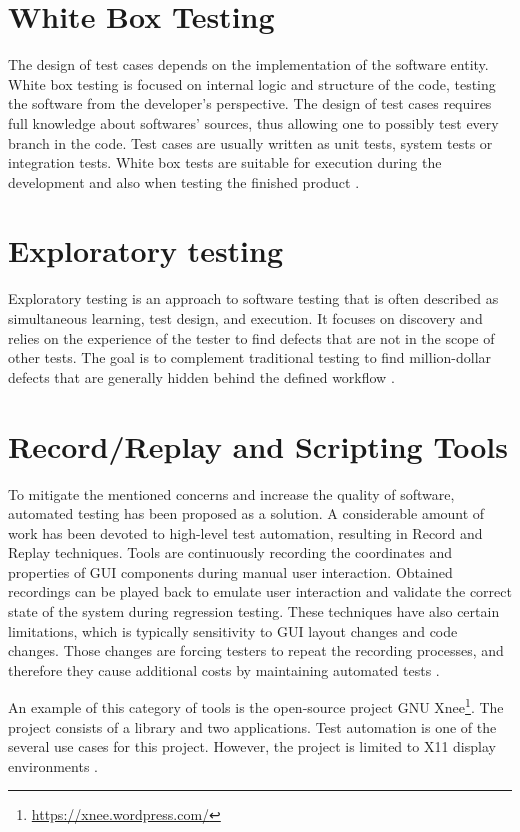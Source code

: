 \section{White Box Testing}
The design of test cases depends on the implementation of the software entity. White box testing is focused on internal logic and structure of the code, testing the software from the developer's perspective. The design of test cases requires full knowledge about softwares' sources, thus allowing one to possibly test every branch in the code. Test cases are usually written as unit tests, system tests or integration tests. White box tests are suitable for execution during the development and also when testing the finished product \cite{white_black}.

\section{Exploratory testing}
Exploratory testing is an approach to software testing that is often described as simultaneous learning, test design, and execution. It focuses on discovery and relies on the experience of the tester to find defects that are not in the scope of other tests. The goal is to complement traditional testing to find million-dollar defects that are generally hidden behind the defined workflow \cite{exploratory_testing}.

\section{Record/Replay and Scripting Tools}\label{record_replay}
To mitigate the mentioned concerns and increase the quality of software, automated testing has been proposed as a solution. A considerable amount of work has been devoted to high-level test automation, resulting in Record and Replay techniques. Tools are continuously recording the coordinates and properties of GUI components during manual user interaction. Obtained recordings can be played back to emulate user interaction and validate the correct state of the system during regression testing. These techniques have also certain limitations, which is typically sensitivity to GUI layout changes and code changes. Those changes are forcing testers to repeat the recording processes, and therefore they cause additional costs by maintaining automated tests \cite{guitesting}. 

An example of this category of tools is the open-source project GNU Xnee\footnote{\url{https://xnee.wordpress.com/}}. The project consists of a library and two applications. Test automation is one of the several use cases for this project. However, the project is limited to X11 display environments \cite{xnee}.

